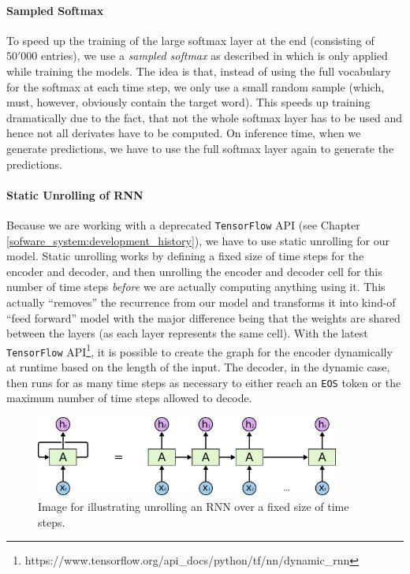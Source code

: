 \paragraph{Sampled Softmax} To speed up the training of the large softmax layer at the end (consisting of $50'000$ entries), we use a \emph{sampled softmax} as described in \cite{Sebastien:2014} which is only applied while training the models. The idea is that, instead of using the full vocabulary for the softmax at each time step, we only use a small random sample (which, must, however, obviously contain the target word). This speeds up training dramatically due to the fact, that not the whole softmax layer has to be used and hence not all derivates have to be computed. On inference time, when we generate predictions, we have to use the full softmax layer again to generate the predictions.

\paragraph{Static Unrolling of RNN} Because we are working with a deprecated \texttt{TensorFlow} API (see Chapter \ref{sofware_system:development_history}), we have to use static unrolling for our model. Static unrolling works by defining a fixed size of time steps for the encoder and decoder, and then unrolling the encoder and decoder cell for this number of time steps \emph{before} we are actually computing anything using it. This actually ``removes'' the recurrence from our model and transforms it into kind-of ``feed forward'' model with the major difference being that the weights are shared between the layers (as each layer represents the same cell). With the latest \texttt{TensorFlow} API\footnote{https://www.tensorflow.org/api\_docs/python/tf/nn/dynamic\_rnn}, it is possible to create the graph for the encoder dynamically at runtime based on the length of the input. The decoder, in the dynamic case, then runs for as many time steps as necessary to either reach an \texttt{EOS} token or the maximum number of time steps allowed to decode.

\begin{figure}
	\label{methods:static_unrolling:unrolled_rnn}
	\centering
	\includegraphics[width=10cm]{img/rnn_unrolled}
	\caption{Image for illustrating unrolling an RNN over a fixed size of time steps.\protect\footnotemark}
\end{figure}

